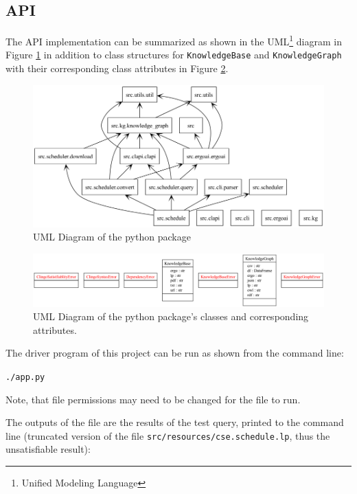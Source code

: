 \documentclass[12pt]{article}
\begin{document}
    \subsection{API}
    \label{subsec:api}

    
    The API implementation can be summarized as shown in the UML\footnote{Unified Modeling Language} diagram in Figure \ref{fig:uml-package} in addition to class structures for {\tt{KnowledgeBase}} and {\tt{KnowledgeGraph}} with their corresponding class attributes in Figure \ref{fig:uml-classes}.

    \begin{figure}[h!]
        \centering
        \includegraphics[scale=0.75]{figures/uml/packages_src.png}
        \caption{UML Diagram of the python package}
        \label{fig:uml-package}
    \end{figure}

    \begin{figure}[h!]
        \centering
        \includegraphics[scale=0.55]{figures/uml/classes_src.png}
        \caption{UML Diagram of the python package's classes and corresponding attributes.}
        \label{fig:uml-classes}
    \end{figure}

    The driver program of this project can be run as shown from the command line:

    {\tt{./app.py}}

    Note, that file permissions may need to be changed for the file to run.

    The outputs of the file are the results of the test query, printed to the command line (truncated version of the file {\tt{src/resources/cse.schedule.lp}}, thus the unsatisfiable result): \\
\end{document}

